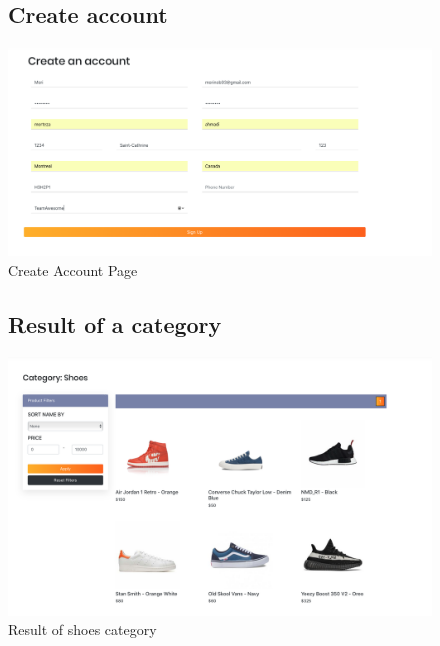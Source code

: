 \documentclass[11pt]{article}
\begin{document}
\begin{figure}[ht!]
    \subsection{Create account}
    \centering
    \includegraphics[width=\textwidth,height=0.3\paperheight,keepaspectratio]{Diagrams/External_Interfaces/Create_Account.png}
    \caption{Create Account Page}
    \label{fig: Create Account Page}
\end{figure}
\FloatBarrier


\begin{figure}[ht!]
    \subsection{Result of a category}
    \centering
    \includegraphics[width=\textwidth,height=3\paperheight,keepaspectratio]{Diagrams/External_Interfaces/Categories.png}
    \caption{Result of shoes category}
    \label{fig: Result of a category}
\end{figure}
\FloatBarrier
\end{document}
